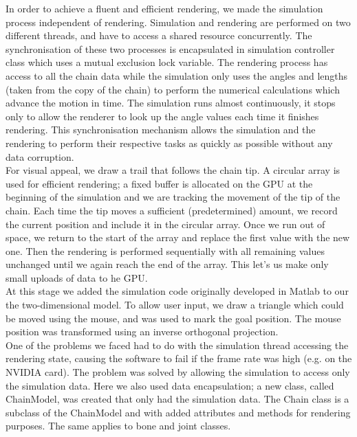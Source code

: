\documentclass[paper=a4, fontsize=11pt]{scrartcl} %
\numberwithin{equation}{section} %
\numberwithin{figure}{section} %
\numberwithin{table}{section} %
\begin{document}
In order to achieve a fluent and efficient rendering, we made the simulation process independent of rendering. Simulation and rendering are performed on two different threads, and have to access a shared resource concurrently. The synchronisation of these two processes is encapsulated in simulation controller class which uses a mutual exclusion lock variable. The rendering process has access to all the chain data while the simulation only uses the angles and lengths (taken from the copy of the chain) to perform the numerical calculations which advance the motion in time. The simulation runs almost continuously, it stops only to allow the renderer to look up the angle values each time it finishes rendering. This synchronisation mechanism allows the simulation and the rendering to perform their respective tasks as quickly as possible without any data corruption. \\

For visual appeal, we draw a trail that follows the chain tip. A circular array is used for efficient rendering; a fixed buffer is allocated on the GPU at the beginning of the simulation and we are tracking the movement of the tip of the chain. Each time the tip moves a sufficient (predetermined) amount, we record the current position and include it in the circular array. Once we run out of space, we return to the start of the array and replace the first value with the new one. Then the rendering is performed sequentially with all remaining values unchanged until we again reach the end of the array. This let's us make only small uploads of data to he GPU. \\

At this stage we added the simulation code originally developed in Matlab to our the two-dimensional model. To allow user input, we draw a triangle which could be moved using the mouse, and was used to mark the goal position. The mouse position was transformed using an inverse orthogonal projection. \\

One of the problems we faced had to do with the simulation thread accessing the rendering state, causing the software to fail if the frame rate was high (e.g. on the NVIDIA card). The problem was solved by allowing the simulation to access only the simulation data. Here we also used data encapsulation; a new class, called ChainModel, was created that only had the simulation data. The Chain class is a subclass of the ChainModel and with added attributes and methods for rendering purposes. The same applies to bone and joint classes. \\
\end{document}
